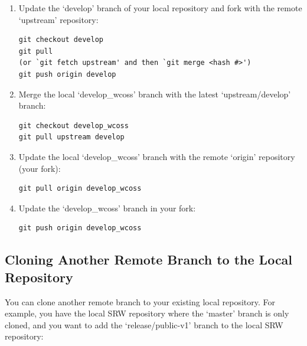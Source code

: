 \documentclass[11pt,fleqn]{report}              %
\begin{document}
\begin{enumerate}
\item Update the `develop' branch of your local repository and fork with the remote `upstream' repository:
\lstset{language=bash}   
\begin{lstlisting}[frame=trBL]
git checkout develop
git pull
(or `git fetch upstream' and then `git merge <hash #>')
git push origin develop
\end{lstlisting}

\item Merge the local `develop\_wcoss' branch with the latest `upstream/develop' branch:
\lstset{language=bash}   
\begin{lstlisting}[frame=trBL]
git checkout develop_wcoss
git pull upstream develop
\end{lstlisting}

\item Update the local `develop\_wcoss' branch with the remote `origin' repository (your fork):
\lstset{language=bash}   
\begin{lstlisting}[frame=trBL]
git pull origin develop_wcoss
\end{lstlisting}

\item Update the `develop\_wcoss' branch in your fork:
\lstset{language=bash}   
\begin{lstlisting}[frame=trBL]
git push origin develop_wcoss
\end{lstlisting}

\end{enumerate}



\subsection{Cloning Another Remote Branch to the Local Repository}
\label{subsec:clone_another_remote}

You can clone another remote branch to your existing local repository. For example, you have the local SRW repository where the `master' branch is only cloned, and you want to add the `release/public-v1' branch to the local SRW repository:
\end{document}
